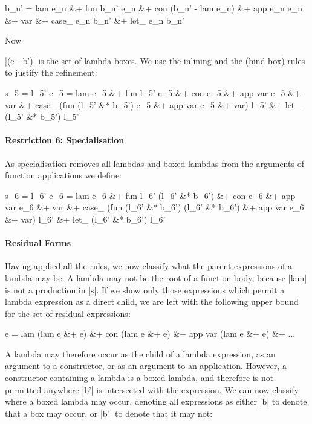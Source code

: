 \ignore\begin{code}
b_n'  =  lam e_n &+ fun b_n' e_n &+ con (b_n' - lam e_n) &+ app e_n e_n &+ var &+
         case_ e_n b_n' &+ let_ e_n b_n'
\end{code}

Now \ignore|(e - b')| is the set of lambda boxes. We use the inlining and the (bind-box) rules to justify the refinement:

\ignore\begin{code}
s_5   =  l_5'
e_5   =  lam e_5 &+ fun l_5' e_5 &+ con e_5 &+ app var e_5 &+ var &+
         case_ (fun (l_5' &* b_5') e_5 &+ app var e_5 &+ var) l_5' &+
         let_ (l_5' &* b_5') l_5'
\end{code}

\paragraph{Restriction 6: Specialisation}
As specialisation removes all lambdas and boxed lambdas from the arguments of function applications we define:

\ignore\begin{code}
s_6  =  l_6'
e_6  =  lam e_6 &+ fun l_6' (l_6' &* b_6') &+ con e_6 &+ app var e_6 &+ var &+
        case_ (fun (l_6' &* b_6') (l_6' &* b_6') &+ app var e_6 &+ var) l_6' &+
        let_ (l_6' &* b_6') l_6'
\end{code}

\paragraph{Residual Forms}
Having applied all the rules, we now classify what the parent expressions of a lambda may be. A lambda may not be the root of a function body, because |lam| is not a production in |s|. If we show only those expressions which permit a lambda expression as a direct child, we are left with the following upper bound for the set of residual expressions:

\ignore\begin{code}
e =  lam (lam e &+ e) &+ con (lam e &+ e) &+
     app var (lam e &+ e) &+ ...
\end{code}

A lambda may therefore occur as the child of a lambda expression, as an argument to a constructor, or as an argument to an application. However, a constructor containing a lambda is a boxed lambda, and therefore is not permitted anywhere |b'| is intersected with the expression. We can now classify where a boxed lambda may occur, denoting all expressions as either |b| to denote that a box may occur, or |b'| to denote that it may not:

